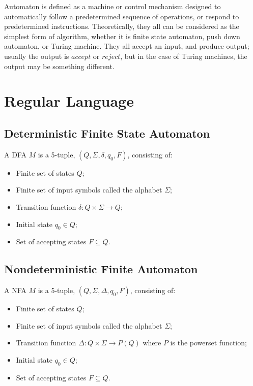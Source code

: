 \documentclass{report}
\begin{document}
	Automaton is defined as a machine or control mechanism designed to automatically follow a predetermined sequence of operations, or respond to predetermined instructions. Theoretically, they all can be considered as the simplest form of algorithm, whether it is finite state automaton, push down automaton, or Turing machine. They all accept an input, and produce output; usually the output is $accept$ or $reject$, but in the case of Turing machines, the output may be something different.
	\section{Regular Language}
		\subsection{Deterministic Finite State Automaton}
			\begin{defn}
				A DFA $M$ is a 5-tuple, $(Q,\Sigma,\delta,q_0,F)$, consisting of:
				\begin{itemize}
					\item Finite set of states $Q$;
					\item Finite set of input symbols called the alphabet $\Sigma$;
					\item Transition function $\delta:Q \times \Sigma \rightarrow Q$;
					\item Initial state $q_0 \in Q$;
					\item Set of accepting states $F \subseteq Q$.
				\end{itemize}
			\end{defn}
		
		\subsection{Nondeterministic Finite Automaton}
			\begin{defn}
				A NFA $M$ is a 5-tuple, $(Q,\Sigma,\Delta,q_0,F)$, consisting of:
				\begin{itemize}
					\item Finite set of states $Q$;
					\item Finite set of input symbols called the alphabet $\Sigma$;
					\item Transition function $\Delta: Q \times \Sigma \rightarrow P(Q)$ where $P$ is the powerset function;
					\item Initial state $q_0 \in Q$;
					\item Set of accepting states $F \subseteq Q$.
				\end{itemize}
			\end{defn}
		
\end{document}
